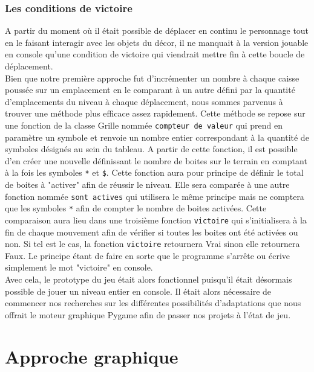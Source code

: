 \documentclass[a4paper,12pt]{article} %
\begin{document}
\subsubsection{Les conditions de victoire}
A partir du moment où il était possible de déplacer en continu le personnage tout en le faisant interagir avec les objets du décor, il ne manquait à la version jouable en console qu'une condition de victoire qui viendrait mettre fin à cette boucle de déplacement.
\\
Bien que notre première approche fut d'incrémenter un nombre à chaque caisse poussée sur un emplacement en le comparant à un autre défini par la quantité d'emplacements du niveau à chaque déplacement, nous sommes parvenus à trouver une méthode plus efficace assez rapidement. Cette méthode se repose sur une fonction de la classe Grille nommée \texttt{compteur de valeur} qui prend en paramètre un symbole et renvoie un nombre entier correspondant à la quantité de symboles désignés au sein du tableau. A partir de cette fonction, il est possible d'en créer une nouvelle définissant le nombre de boites sur le terrain en comptant à la fois les symboles \texttt{*} et \texttt{\$}. Cette fonction aura pour principe de définir le total de boites à "activer" afin de réussir le niveau. Elle sera comparée à une autre fonction nommée \texttt{sont actives} qui utilisera le même principe mais ne comptera que les symboles \texttt{*} afin de compter le nombre de boites activées. Cette comparaison aura lieu dans une troisième fonction \texttt{victoire} qui s'initialisera à la fin de chaque mouvement afin de vérifier si toutes les boites ont été activées ou non. Si tel est le cas, la fonction \texttt{victoire} retournera Vrai sinon elle retournera Faux. Le principe étant de faire en sorte que le programme s'arrête ou écrive simplement le mot "victoire" en console.
\\
Avec cela, le prototype du jeu était alors fonctionnel puisqu'il était désormais possible de jouer un niveau entier en console. Il était alors nécessaire de commencer nos recherches sur les différentes possibilités d'adaptations que nous offrait le moteur graphique Pygame afin de passer nos projets à l'état de jeu.


\section{Approche graphique}
\end{document}

